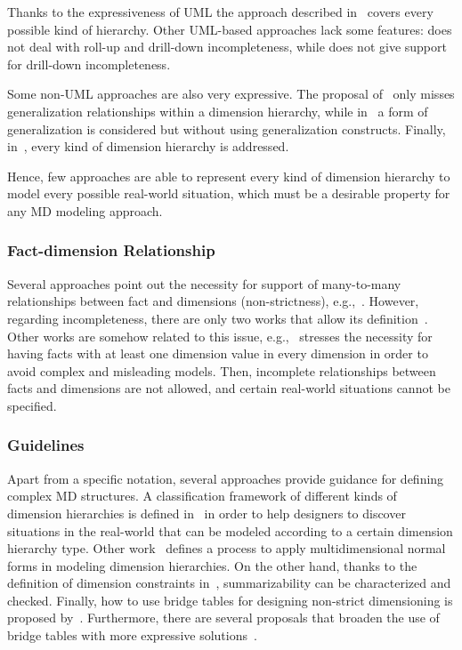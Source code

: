 Thanks to the expressiveness of UML the approach described
in~\cite{DBLP:journals/dke/Lujan-MoraTS06} covers every possible
kind of hierarchy. Other UML-based approaches lack some features:
\cite{DBLP:journals/is/AbelloSS06} does not deal with roll-up and
drill-down incompleteness, while \cite{DBLP:journals/dss/PratAC06}
does not give support for drill-down incompleteness.

Some non-UML approaches are also very expressive. The proposal
of~\cite{DBLP:journals/is/PedersenJD01} only misses generalization
relationships within a dimension hierarchy, while
in~\cite{DBLP:journals/dke/MalinowskiZ06} a form of generalization
is considered but without using generalization constructs. Finally,
in~\cite{MansmannIJDWDM07}, every kind of dimension hierarchy is
addressed.

Hence, few approaches are able to represent every kind of dimension
hierarchy to model every possible real-world situation, which must
be a desirable property for any MD modeling approach.

\subsubsection{Fact-dimension Relationship} Several approaches point out the necessity for
support of many-to-many relationships between fact and dimensions
(non-strictness), e.g.,~\cite{DBLP:journals/dke/Lujan-MoraTS06}.
However, regarding incompleteness, there are only two works that
allow its
definition~\cite{DBLP:journals/dke/Lujan-MoraTS06,DBLP:journals/is/AbelloSS06}.
Other works are somehow related to this issue, e.g.,
\cite{DBLP:conf/vldb/PedersenJD99}~stresses the necessity for having
facts with at least one dimension value in every dimension in order
to avoid complex and misleading models. Then, incomplete
relationships between facts and dimensions are not allowed, and
certain real-world situations cannot be specified.

\subsubsection{Guidelines} Apart from a specific notation, several approaches provide guidance for defining complex MD
structures. A classification framework of different kinds of
dimension hierarchies is defined
in~\cite{DBLP:journals/dke/MalinowskiZ06,DBLP:journals/is/PedersenJD01,MansmannIJDWDM07}
in order to help designers to discover situations in the real-world
that can be modeled according to a certain dimension hierarchy type.
Other work~\cite{DBLP:conf/dmdw/HusemannLV00} defines a process to
apply multidimensional normal forms in modeling dimension
hierarchies. On the other hand, thanks to the definition of
dimension constraints in~\cite{DBLP:journals/tods/HurtadoGM05},
summarizability can be characterized and checked. Finally, how to
use bridge tables for designing non-strict dimensioning is proposed
by~\cite{book/Kimball/DW}. Furthermore, there are several proposals
that broaden the use of bridge tables with more expressive
solutions~\cite{DBLP:journals/is/PedersenJD01,DBLP:conf/dmdw/SongRME01}.


